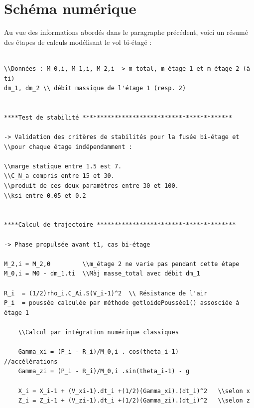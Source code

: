 \documentclass[a4paper]{article}
\begin{document}
\newpage 

\section{Schéma numérique}

Au vue des informations abordés dans le paragraphe précédent, voici un résumé des étapes de calculs modélisant le vol bi-étagé :

\begin{verbatim}

\\Données : M_0,i, M_1,i, M_2,i -> m_total, m_étage 1 et m_étage 2 (à ti)
dm_1, dm_2 \\ débit massique de l'étage 1 (resp. 2)


****Test de stabilité ******************************************

-> Validation des critères de stabilités pour la fusée bi-étage et
\\pour chaque étage indépendamment :

\\marge statique entre 1.5 est 7.
\\C_N_a compris entre 15 et 30.
\\produit de ces deux paramètres entre 30 et 100.
\\ksi entre 0.05 et 0.2


****Calcul de trajectoire ***************************************

-> Phase propulsée avant t1, cas bi-étage 

M_2,i = M_2,0		  \\m_étage 2 ne varie pas pendant cette étape	
M_0,i = M0 - dm_1.ti  \\Màj masse_total avec débit dm_1

R_i  = (1/2)rho_i.C_Ai.S(V_i-1)^2  \\ Résistance de l'air
P_i  = poussée calculée par méthode getloidePoussée1() assosciée à étage 1

	\\Calcul par intégration numérique classiques

	Gamma_xi = (P_i - R_i)/M_0,i . cos(theta_i-1)		//accélérations
	Gamma_zi = (P_i - R_i)/M_0,i .sin(theta_i-1) - g

	X_i = X_i-1 + (V_xi-1).dt_i +(1/2)(Gamma_xi).(dt_i)^2	\\selon x
	Z_i = Z_i-1 + (V_zi-1).dt_i +(1/2)(Gamma_zi).(dt_i)^2	\\selon z


\end{verbatim}
\end{document}
